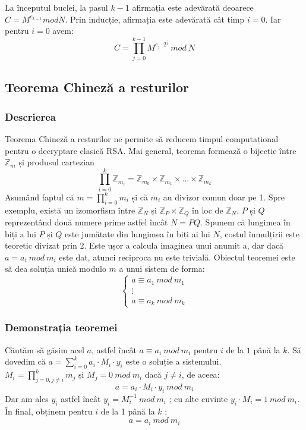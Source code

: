\documentclass[12]{report}
\begin{document}
      
      La începutul buclei, la pasul $ k-1 $ afirmația este adevărată deoarece $ C = M^{e_{k-1}} mod N$. Prin inducție, afirmația este adevărată cât timp $ i=0$. Iar pentru $i=0$ avem: \\
      $$ C= \prod_{j=0}^{k-1} M^{e_j \cdot   2^j}  \ mod \ N $$
      
     \subsection{Teorema Chineză a resturilor}
      \subsubsection{Descrierea}
      Teorema Chineză a resturilor ne permite să reducem timpul computațional pentru o decryptare clasică RSA. Mai general, teorema formează o bijecție între $ \mathbb{Z}_m $ și produsul cartezian \\
      $$ \prod_{i=0}^{k} \mathbb{Z}_{m_i} = \mathbb{Z}_{m_0} \times \mathbb{Z}_{m_1} \times \dots \times  \mathbb{Z}_{m_k}$$
      Asumând faptul că $ m = \prod_{i=0}^{k} m_i $ și că $ m_i $ au divizor comun doar pe 1. Spre exemplu, există un izomorfism între $ \mathbb{Z}_N$ și $\mathbb{Z}_P \times \mathbb{Z}_Q  $ în loc de $ \mathbb{Z}_N $, $ P $ și $Q$ reprezentând două numere prime astfel încât $ N=PQ$. Spunem că lungimea în biți a lui $P$ și $Q$ este jumătate din lungimea în biți ai lui $N$, costul înmulțirii este teoretic divizat prin 2. Este ușor a calcula imaginea unui anumit a, dar dacă $ a= a_i \ mod \ m_i $ este dat, atunci reciproca nu este trivială. Obiectul teoremei este să dea soluția unică modulo $m$ a unui sistem de forma: \\
    \[
\left\{ 
\begin{array}{c}
a \equiv a_1 \ mod \ m_1 \\ 
 \vdots  \\ 
a \equiv a_k \ mod \ m_k
\end{array}
\right. 
\]

	 \subsubsection{Demonstrația teoremei}
	 Căutăm să găsim acel $a$, astfel încât $ a \equiv a_i \ mod \ m_i $ pentru $i$ de la $1$ până la $k$. Să dovedim că $ a = \sum_{i=0}^{k} a_i \cdot   M_i \cdot   y_i $ este o soluție a sistemului. \\
	 $M_i= \prod_{j=0,j \neq i}^{k} m_j $ și $M_j=0 \ mod \ m_i $ dacă $j \neq i$, de aceea: 
	 $$ a = a_i \cdot   M_i \cdot   y_i \ mod \ m_i $$
	 Dar am ales $y_i$ astfel încât $y_i = M_{i}^{-1} \ mod \ m_i$ ; cu alte cuvinte $y_i \cdot   M_i = 1 \ mod \ m_i$. În final, obținem pentru $i$ de la 1 până la $k$ :
	 $$ a = a_i \  mod \ m_i$$
	 
\end{document}
